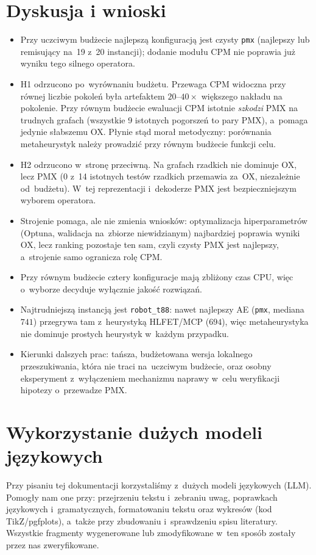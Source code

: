 \documentclass[pdflatex,sn-mathphys,Numbered]{sn-jnl}
\begin{document}
\section{Dyskusja i wnioski}
\label{sec:wnioski}
\begin{itemize}[itemsep=3pt, topsep=3pt]
    \item Przy uczciwym budżecie najlepszą konfiguracją jest czysty \texttt{pmx}
    (najlepszy lub remisujący na~19 z~20 instancji); dodanie modułu CPM nie
    poprawia już wyniku tego silnego operatora.
    \item H1 odrzucono po~wyrównaniu budżetu. Przewaga CPM widoczna przy równej
    liczbie pokoleń była artefaktem $20$--$40\times$ większego nakładu na pokolenie.
    Przy równym budżecie ewaluacji CPM istotnie \emph{szkodzi} PMX na trudnych
    grafach (wszystkie 9 istotnych pogorszeń to pary PMX), a~pomaga jedynie
    słabszemu OX. Płynie stąd morał metodyczny: porównania metaheurystyk należy
    prowadzić przy równym budżecie funkcji celu.
    \item H2 odrzucono w~stronę przeciwną. Na grafach rzadkich nie dominuje OX,
    lecz PMX (0 z~14 istotnych testów rzadkich przemawia za~OX, niezależnie
    od~budżetu). W~tej reprezentacji i~dekoderze PMX jest bezpieczniejszym wyborem
    operatora.
    \item Strojenie pomaga, ale nie zmienia wniosków: optymalizacja
    hiperparametrów (Optuna, walidacja na~zbiorze niewidzianym) najbardziej
    poprawia wyniki OX, lecz ranking pozostaje ten sam, czyli czysty PMX jest
    najlepszy, a~strojenie samo ogranicza rolę CPM.
    \item Przy równym budżecie cztery konfiguracje mają zbliżony czas CPU, więc
    o~wyborze decyduje wyłącznie jakość rozwiązań.
    \item Najtrudniejszą instancją jest \texttt{robot\_t88}: nawet najlepszy AE
    (\texttt{pmx}, mediana $741$) przegrywa tam z~heurystyką HLFET/MCP ($694$),
    więc metaheurystyka nie dominuje prostych heurystyk w~każdym przypadku.
    \item Kierunki dalszych prac: tańsza, budżetowana wersja lokalnego
    przeszukiwania, która nie traci na~uczciwym budżecie, oraz osobny eksperyment
    z~wyłączeniem mechanizmu naprawy w~celu weryfikacji hipotezy o~przewadze PMX.
\end{itemize}

\section{Wykorzystanie dużych modeli językowych}
Przy pisaniu tej dokumentacji korzystaliśmy z~dużych modeli językowych (LLM).
Pomogły nam one przy: przejrzeniu tekstu i~zebraniu uwag, poprawkach językowych
i~gramatycznych, formatowaniu tekstu oraz wykresów (kod TikZ/pgfplots), a~także
przy zbudowaniu i~sprawdzeniu spisu literatury. Wszystkie fragmenty wygenerowane
lub zmodyfikowane w~ten sposób zostały przez nas zweryfikowane.
\end{document}
